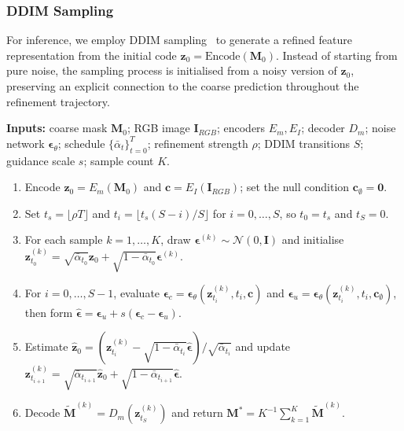 \documentclass[jimaging,article,submit,pdftex,moreauthors]{Definitions/mdpi}%
\begin{document}
\subsubsection{DDIM Sampling}



For inference, we employ DDIM sampling~\cite{Song2021} to generate a refined feature representation from the initial code $\mathbf{z}_0=\mathrm{Encode}(\mathbf{M}_0)$. Instead of starting from pure noise, the sampling process is initialised from a noisy version of $\mathbf{z}_0$, preserving an explicit connection to the coarse prediction throughout the refinement trajectory.



\begin{table}[htbp]
\caption{Sampling procedure for refinement of the encoded multi-channel representation.}
\label{alg:latent_refinement}
\centering
\begin{minipage}{0.96\textwidth}
\small
\textbf{Inputs:} coarse mask $\mathbf{M}_0$; RGB image $\mathbf{I}_{RGB}$; encoders $E_m,E_I$; decoder $D_m$; noise network $\boldsymbol{\epsilon}_\theta$; schedule $\{\bar{\alpha}_t\}_{t=0}^{T}$; refinement strength $\rho$; DDIM transitions $S$; guidance scale $s$; sample count $K$.\par
\begin{enumerate}[leftmargin=2em,itemsep=2pt,topsep=4pt]
  \item Encode $\mathbf{z}_0=E_m(\mathbf{M}_0)$ and $\mathbf{c}=E_I(\mathbf{I}_{RGB})$; set the null condition $\mathbf{c}_{\emptyset}=\mathbf{0}$.
  \item Set $t_s=\lfloor\rho T\rfloor$ and $t_i=\lfloor t_s(S-i)/S\rfloor$ for $i=0,\ldots,S$, so $t_0=t_s$ and $t_S=0$.
  \item For each sample $k=1,\ldots,K$, draw $\boldsymbol{\epsilon}^{(k)}\sim\mathcal{N}(0,\mathbf{I})$ and initialise $\mathbf{z}^{(k)}_{t_0}=\sqrt{\bar{\alpha}_{t_0}}\mathbf{z}_0+\sqrt{1-\bar{\alpha}_{t_0}}\boldsymbol{\epsilon}^{(k)}$.
  \item For $i=0,\ldots,S-1$, evaluate $\boldsymbol{\epsilon}_{c}=\boldsymbol{\epsilon}_\theta(\mathbf{z}^{(k)}_{t_i},t_i,\mathbf{c})$ and $\boldsymbol{\epsilon}_{u}=\boldsymbol{\epsilon}_\theta(\mathbf{z}^{(k)}_{t_i},t_i,\mathbf{c}_{\emptyset})$, then form $\hat{\boldsymbol{\epsilon}}=\boldsymbol{\epsilon}_{u}+s(\boldsymbol{\epsilon}_{c}-\boldsymbol{\epsilon}_{u})$.
  \item Estimate $\hat{\mathbf{z}}_0=(\mathbf{z}^{(k)}_{t_i}-\sqrt{1-\bar{\alpha}_{t_i}}\hat{\boldsymbol{\epsilon}})/\sqrt{\bar{\alpha}_{t_i}}$ and update $\mathbf{z}^{(k)}_{t_{i+1}}=\sqrt{\bar{\alpha}_{t_{i+1}}}\hat{\mathbf{z}}_0+\sqrt{1-\bar{\alpha}_{t_{i+1}}}\hat{\boldsymbol{\epsilon}}$.
  \item Decode $\tilde{\mathbf{M}}^{(k)}=D_m(\mathbf{z}^{(k)}_{t_S})$ and return $\mathbf{M}^*=K^{-1}\sum_{k=1}^{K}\tilde{\mathbf{M}}^{(k)}$.
\end{enumerate}
\end{minipage}
\end{table}
\end{document}

